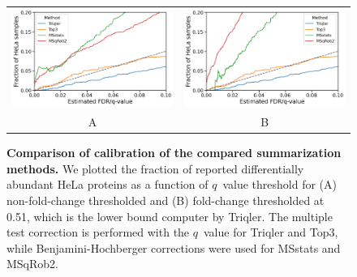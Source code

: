 \documentclass[10pt,letterpaper]{article}
\begin{document}
\begin{figure}[hbt]
    \centering
    \begin{tabular}{cc} 
        \includegraphics[width=0.5\linewidth]{../../result/report_plots_pipeline/calibration_ID_0.png} & 
        \includegraphics[width=0.5\linewidth]{../../result/report_plots_pipeline/calibration_ID_0.51.png} \\
        A & B
    \end{tabular}
  \caption{{\bf Comparison of calibration of the compared summarization methods.} We plotted the fraction of reported differentially abundant HeLa proteins as a function of $q$~value threshold for (A) non-fold-change thresholded and (B) fold-change thresholded at 0.51, which is the lower bound computer by Triqler. The multiple test correction is performed with the $q$~value for Triqler and Top3, while Benjamini-Hochberger corrections were used for MSstats and MSqRob2. \label{fig:frac_hela_vs_fdr}}
\end{figure}



\end{document}
